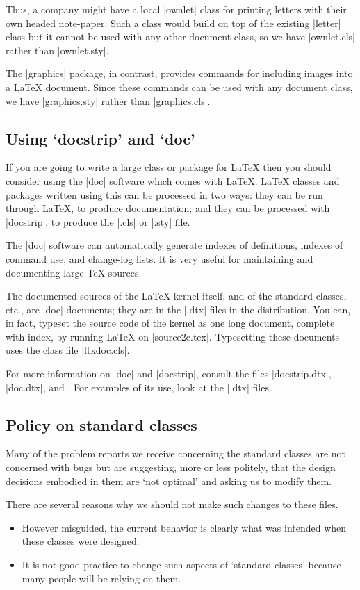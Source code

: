 \documentclass{ltxguide}
\begin{document}
Thus, a company might have a local |ownlet| class for printing letters
with their own headed note-paper.  Such a class would build on top of
the existing |letter| class but it cannot be used with any other
document class, so we have |ownlet.cls| rather than |ownlet.sty|.

The |graphics| package, in contrast, provides commands for including
images into a \LaTeX{} document.  Since these commands can be used
with any document class, we have |graphics.sty| rather than
|graphics.cls|.

\subsection{Using `docstrip' and `doc'}

If you are going to write a large class or package for \LaTeX{} then
you should consider using the |doc| software which comes with
\LaTeX{}.
\LaTeX{} classes and packages written using this can be
processed in two ways: they can be run through \LaTeX{}, to produce
documentation; and they can be processed with |docstrip|, to produce
the |.cls| or |.sty| file.

The |doc| software can automatically generate indexes of definitions,
indexes of command use, and change-log lists.  It is very useful for
maintaining and documenting large \TeX{} sources.

The documented sources of the \LaTeX{} kernel itself, and of the
standard classes, etc., are |doc| documents; they are in the |.dtx|
files in the distribution.  You can, in fact, typeset the source code
of the kernel as one long document, complete with index, by running
\LaTeX{} on |source2e.tex|.  Typesetting these documents uses the
class file |ltxdoc.cls|.

For more information on |doc| and |docstrip|, consult the files
|docstrip.dtx|, |doc.dtx|, and \emph{\LaTeXcomp}.  For examples of its
use, look at the |.dtx| files.

\subsection{Policy on standard classes}

Many of the problem reports we receive concerning the standard classes
are not concerned with bugs but are suggesting, more or less politely,
that the design decisions embodied in them are `not optimal' and
asking us to modify them.

There are several reasons why we should not make such changes to these
files.
\begin{itemize}
\item
  However misguided, the current behavior is clearly what was
  intended when these classes were designed.
\item
  It is not good practice to change such aspects of `standard classes'
  because many people will be relying on them.
\end{itemize}
\end{document}
